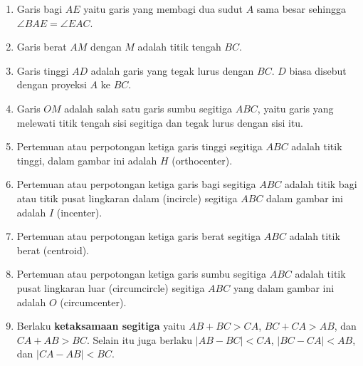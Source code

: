 \begin{enumerate}
    \item Garis bagi $AE$ yaitu garis yang membagi dua sudut $A$ sama besar sehingga $\angle BAE = \angle EAC$. 
    \item Garis berat $AM$ dengan $M$ adalah titik tengah $BC$.
    \item Garis tinggi $AD$ adalah garis yang tegak lurus dengan $BC$. $D$ biasa disebut dengan proyeksi $A$ ke $BC$.
    \item Garis $OM$ adalah salah satu garis sumbu segitiga $ABC$, yaitu garis yang melewati titik tengah sisi segitiga dan tegak lurus dengan sisi itu.
    \item Pertemuan atau perpotongan ketiga garis tinggi segitiga $ABC$ adalah titik tinggi, dalam gambar ini adalah $H$ (orthocenter).
    \item Pertemuan atau perpotongan ketiga garis bagi segitiga $ABC$ adalah titik bagi atau titik pusat lingkaran dalam (incircle) segitiga $ABC$ dalam gambar ini adalah $I$ (incenter).
    \item Pertemuan atau perpotongan ketiga garis berat segitiga $ABC$ adalah titik berat (centroid).
    \item Pertemuan atau perpotongan ketiga garis sumbu segitiga $ABC$ adalah titik pusat lingkaran luar (circumcircle) segitiga $ABC$ yang dalam gambar ini adalah $O$ (circumcenter).
    \item Berlaku \textbf{ketaksamaan segitiga} yaitu $AB+BC>CA$, $BC+CA>AB$, dan $CA+AB>BC$. Selain itu juga berlaku $|AB-BC|<CA$, $|BC-CA|<AB$, dan $|CA-AB|<BC$.
\end{enumerate}

